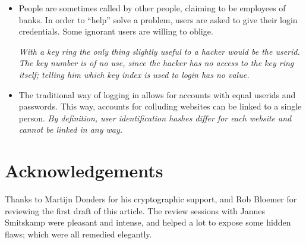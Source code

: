 \begin{itemize}
{since the wrong hash is sent,
and no keys or login values are sent over the line.}
\item People are sometimes called by other people,
claiming to be employees of banks.
In order to ``help'' solve a problem,
users are asked to give their login credentials.
Some ignorant users are willing to oblige.
\par
\emph{With a key ring the only thing slightly useful to a hacker would be the userid.
The key number is of no use,
since the hacker has no access to the key ring itself;
telling him which key index is used to login has no value.}
\item The traditional way of logging in allows for accounts with equal userids and passwords.
This way,
accounts for colluding websites can be linked to a single person.
\emph{By definition, user identification hashes differ for each website and cannot be linked in any way.}
\end{itemize}

\section*{Acknowledgements}\dashes\newline
Thanks to Martijn Donders for his cryptographic support,
and Rob Bloemer for reviewing the first draft of this article.
The review sessions with Jannes Smitskamp were pleasant and intense,
and helped a lot to expose some hidden flaws;
which were all remedied elegantly.
